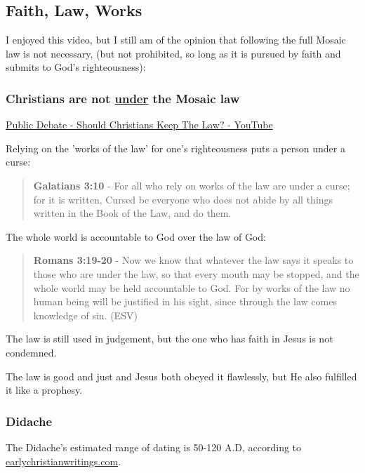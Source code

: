 \documentclass[11pt]{article}
\begin{document}
\subsection{Faith, Law, Works}
\label{sec:org37fbe81}
I enjoyed this video, but I still am of the opinion that following the full Mosaic law is not necessary, (but not prohibited, so long as it is pursued by faith and submits to God's righteousness):

\subsubsection{Christians are not \underline{under} the Mosaic law}
\label{sec:orga0ead0b}

\href{https://www.youtube.com/watch?v=CNHKqhwu6Bo}{Public Debate - Should Christians Keep The Law? - YouTube}

Relying on the 'works of the law' for one's righteousness puts a person under a curse:

\begin{quote}
\textbf{Galatians 3:10} - For all who rely on works of the law are under a curse; for it is written, Cursed be everyone who does not abide by all things written in the Book of the Law, and do them.
\end{quote}

The whole world is accountable to God over the law of God:

\begin{quote}
\textbf{Romans 3:19-20} - Now we know that whatever the law says it speaks to those who are under the law, so that every mouth may be stopped, and the whole world may be held accountable to God. For by works of the law no human being will be justified in his sight, since through the law comes knowledge of sin. (ESV)
\end{quote}

The law is still used in judgement, but the one who has faith in Jesus is not condemned.

The law is good and just and Jesus both obeyed it flawlessly, but He also fulfilled it like a prophesy.

\subsubsection{Didache}
\label{sec:org6dab7cb}
The Didache's estimated range of dating is 50-120 A.D, according to \href{https://www.earlychristianwritings.com/text/didache-roberts.html}{earlychristianwritings.com}.
\end{document}
